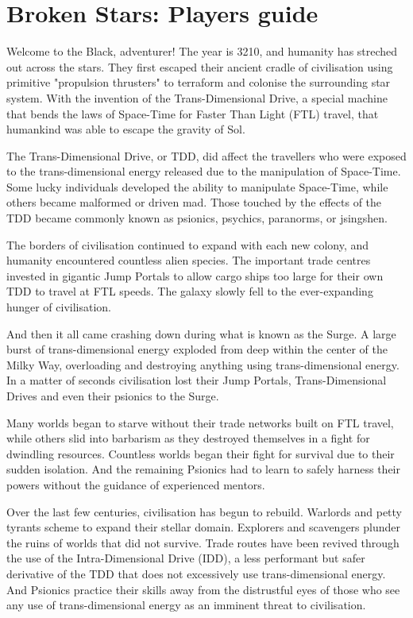 \documentclass[10pt,twoside]{article}
\begin{document}
    \section*{Broken Stars: Players guide}

    \addtocounter{section}{1}

    Welcome to the Black, adventurer! The year is 3210, and humanity has streched out across the stars. They first escaped their ancient cradle of civilisation using primitive "propulsion thrusters" to terraform and colonise the surrounding star system. With the invention of the Trans-Dimensional Drive, a special machine that bends the laws of Space-Time for Faster Than Light (FTL) travel, that humankind was able to escape the gravity of Sol.

    The Trans-Dimensional Drive, or TDD, did affect the travellers who were exposed to the trans-dimensional energy released due to the manipulation of Space-Time. Some lucky individuals developed the ability to manipulate Space-Time, while others became malformed or driven mad. Those touched by the effects of the TDD became commonly known as psionics, psychics, paranorms, or jsingshen.

    The borders of civilisation continued to expand with each new colony, and humanity encountered countless alien species. The important trade centres invested in gigantic Jump Portals to allow cargo ships too large for their own TDD to travel at FTL speeds. The galaxy slowly fell to the ever-expanding hunger of civilisation.

    And then it all came crashing down during what is known as the Surge. A large burst of trans-dimensional energy exploded from deep within the center of the Milky Way, overloading and destroying anything using trans-dimensional energy. In a matter of seconds civilisation lost their Jump Portals, Trans-Dimensional Drives and even their psionics to the Surge.

    Many worlds began to starve without their trade networks built on FTL travel, while others slid into barbarism as they destroyed themselves in a fight for dwindling resources. Countless worlds began their fight for survival due to their sudden isolation. And the remaining Psionics had to learn to safely harness their powers without the guidance of experienced mentors.

    Over the last few centuries, civilisation has begun to rebuild. Warlords and petty tyrants scheme to expand their stellar domain. Explorers and scavengers plunder the ruins of worlds that did not survive. Trade routes have been revived through the use of the  Intra-Dimensional Drive (IDD), a less performant but safer derivative of the TDD that does not excessively use trans-dimensional energy. And Psionics practice their skills away from the distrustful eyes of those who see any use of trans-dimensional energy as an imminent threat to civilisation.
\end{document}
